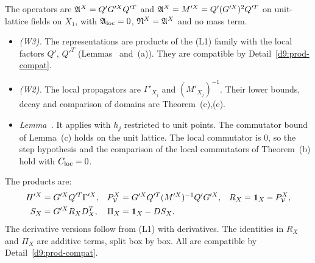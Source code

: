 \begin{detail}\label{d9:L2}
The operators are $\mathfrak A^X=Q'G'^XQ'^T$ and $\mathfrak A^X=M'^X=Q'(G'^X)^2Q'^T$ on unit-lattice fields on $X_1$, with $\mathfrak A_{\rm loc}=0$, $\mathfrak N^X=\mathfrak A^X$ and no mass term.
\begin{itemize}
\item \emph{(W3).} The representations are products of the (L1) family with the local factors $Q'$, $Q'^T$ (Lemmas~ and~(a)). They are compatible by Detail~\ref{d9:prod-compat}.
\item \emph{(W2).} The local propagators are $\Gamma'_{X_j}$ and $(M'_{X_j})^{-1}$. Their lower bounds, decay and comparison of domains are Theorem~(c),(e).
\item \emph{Lemma~.} It applies with $h_j$ restricted to unit points. The commutator bound of Lemma~(c) holds on the unit lattice. The local commutator is $0$, so the step hypothesis and the comparison of the local commutators of Theorem~(b) hold with $C_{\rm loc}=0$.
\end{itemize}
The products are:
\begin{align*}
H'^X&=G'^XQ'^T\Gamma'^X, &P^X_\mathcal V&=G'^XQ'^T(M'^X)^{-1}Q'G'^X, &R_X&=\mathbf 1_X-P^X_\mathcal V,\\
S_X&=G'^XR_XD^T_X, &\Pi_X&=\mathbf 1_X-DS_X .
\end{align*}
The derivative versions follow from (L1) with derivatives. The identities in $R_X$ and $\Pi_X$ are additive terms, split box by box. All are compatible by Detail~\ref{d9:prod-compat}.
\end{detail}


